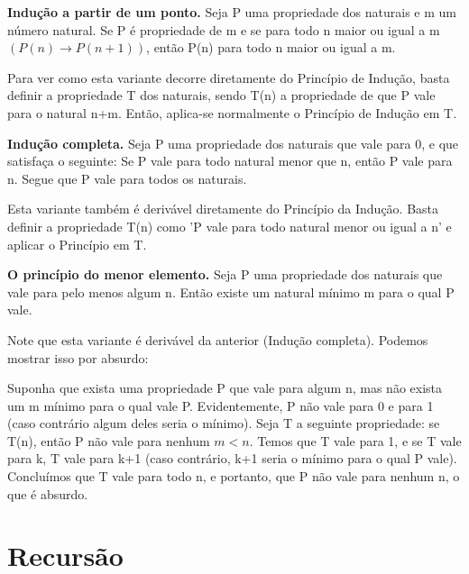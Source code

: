 \textbf{Indução a partir de um ponto.} Seja P uma propriedade dos naturais e m um número natural. Se P é propriedade de m e se para todo n maior ou igual a m $(P(n) \to P(n+1))$, então P(n) para todo n maior ou igual a m.

Para ver como esta variante decorre diretamente do Princípio de Indução, basta definir a propriedade T dos naturais, sendo T(n) a propriedade de que P vale para o natural n+m. Então, aplica-se normalmente o Princípio de Indução em T.

\textbf{Indução completa.} Seja P uma propriedade dos naturais que vale para 0, e que satisfaça o seguinte: Se P vale para todo natural menor que n, então P vale para n. Segue que P vale para todos os naturais.

Esta variante também é derivável diretamente do Princípio da Indução. Basta definir a propriedade T(n) como 'P vale para todo natural menor ou igual a n' e aplicar o Princípio em T.

\textbf{O princípio do menor elemento.} Seja P uma propriedade dos naturais que vale para pelo menos algum n. Então existe um natural mínimo m para o qual P vale.

Note que esta variante é derivável da anterior (Indução completa). Podemos mostrar isso por absurdo:

Suponha que exista uma propriedade P que vale para algum n, mas não exista um m mínimo para o qual vale P. Evidentemente, P não vale para 0 e para 1 (caso contrário algum deles seria o mínimo). Seja T a seguinte propriedade: se T(n), então P não vale para nenhum $m < n$. Temos que T vale para 1, e se T vale para k, T vale para k+1 (caso contrário, k+1 seria o mínimo para o qual P vale). Concluímos que T vale para todo n, e portanto, que P não vale para nenhum n, o que é absurdo.

\section{Recursão}
\label{sec:recursao}

